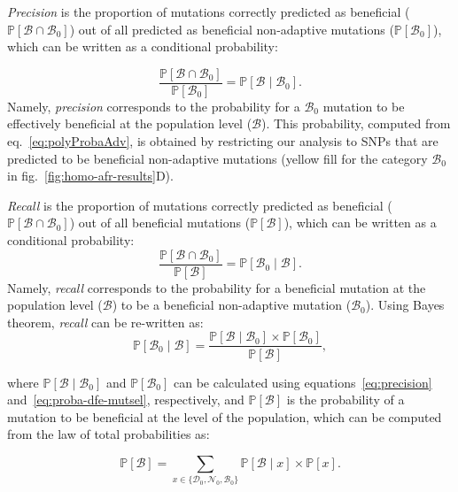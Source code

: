 \documentclass{article}
\newcommand{\proba}{\mathbb{P}}
\newcommand{\SphyDel}{\mathcal{D}_0}
\newcommand{\SphyNeu}{\mathcal{N}_0}
\newcommand{\SphyBen}{\mathcal{B}_0}
\newcommand{\Sphyclass}{x}
\newcommand{\given}{\mid}
\newcommand{\SpopBen}{\mathcal{B}}
\newcommand{\ProbaPopBen}{\proba [ \SpopBen ]}
\begin{document}
    \textit{Precision} is the proportion of mutations correctly predicted as beneficial ($\proba [ \SpopBen \cap  \SphyBen]$) out of all predicted as beneficial non-adaptive mutations ($\proba [ \SphyBen]$), which can be written as a conditional probability:

    \begin{equation}
        \frac{\proba [ \SpopBen  \cap  \SphyBen]}{\proba [ \SphyBen]} = \proba [ \SpopBen  \given  \SphyBen].
        \label{eq:precision}
    \end{equation}
    Namely, \textit{precision} corresponds to the probability for a $\SphyBen$ mutation to be effectively beneficial at the population level ($\SpopBen$).
    This probability, computed from eq.~\ref{eq:polyProbaAdv}, is obtained by restricting our analysis to SNPs that are predicted to be beneficial non-adaptive mutations (yellow fill for the category $\SphyBen$ in fig.~\ref{fig:homo-afr-results}D).

    \textit{Recall} is the proportion of mutations correctly predicted as beneficial ($\proba [ \SpopBen \cap  \SphyBen]$) out of all beneficial mutations ($\proba [ \SpopBen]$), which can be written as a conditional probability:
    \begin{equation}
        \frac{\proba [ \SpopBen \cap  \SphyBen]}{\proba [ \SpopBen]} = \proba [ \SphyBen  \given \SpopBen ].
    \end{equation}
    Namely, \textit{recall} corresponds to the probability for a beneficial mutation at the population level ($\SpopBen$) to be a beneficial non-adaptive mutation ($\SphyBen$).
    Using Bayes theorem, \textit{recall} can be re-written as:
    \begin{equation}
        \proba [\SphyBen \given \SpopBen] = \frac{\proba [\SpopBen \given \SphyBen] \times \proba[\SphyBen]}{\ProbaPopBen},
        \label{eq:bayes}
    \end{equation}

    where $\proba [\SpopBen \given \SphyBen]$ and $\proba [ \SphyBen ]$ can be calculated using equations~\ref{eq:precision} and~\ref{eq:proba-dfe-mutsel}, respectively, and $\proba [ \SpopBen ]$ is the probability of a mutation to be beneficial at the level of the population, which can be computed from the law of total probabilities as:

    \begin{equation}
        \proba [ \SpopBen ] = \sum_{\Sphyclass \in \{\SphyDel, \SphyNeu, \SphyBen \} }\proba [\SpopBen \given \Sphyclass ] \times \proba [\Sphyclass ].
        \label{eq:total_proba}
    \end{equation}
\end{document}
